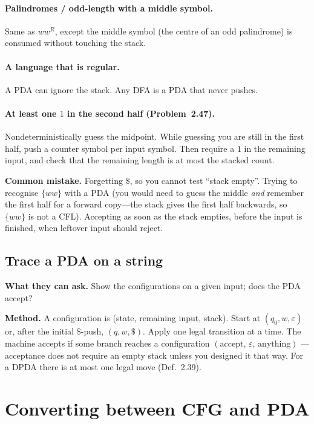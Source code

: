 \documentclass[11pt,a4paper]{article}
\newcommand{\eps}{\varepsilon}
\begin{document}
\paragraph{Palindromes / odd-length with a middle symbol.}
Same as $ww^R$, except the middle symbol (the centre of an odd
palindrome) is consumed without touching the stack.

\paragraph{A language that is regular.}
A PDA can ignore the stack. Any DFA is a PDA that never pushes.

\paragraph{At least one $1$ in the second half (Problem~2.47).}
Nondeterministically guess the midpoint. While guessing you are
still in the first half, push a counter symbol per input symbol.
Then require a $1$ in the remaining input, and check that the
remaining length is at most the stacked count.

\textbf{Common mistake.}
Forgetting $\$$, so you cannot test ``stack empty''. Trying to
recognise $\{ww\}$ with a PDA (you would need to guess the middle
\emph{and} remember the first half for a forward copy---the stack
gives the first half backwards, so $\{ww\}$ is not a CFL).
Accepting as soon as the stack empties, before the input is
finished, when leftover input should reject.

\subsection{Trace a PDA on a string}

\textbf{What they can ask.}
Show the configurations on a given input; does the PDA accept?

\textbf{Method.}
A configuration is (state, remaining input, stack). Start at
$(q_0,w,\eps)$ or, after the initial $\$$-push, $(q,w,\$)$.
Apply one legal transition at a time. The machine accepts if some
branch reaches a configuration $(\text{accept},\,\eps,\,\text{anything})$
--- acceptance does not require an empty stack unless you designed
it that way. For a DPDA there is at most one legal move
(Def.~2.39).

\section{Converting between CFG and PDA}
\label{type:cfg-pda}
\end{document}
